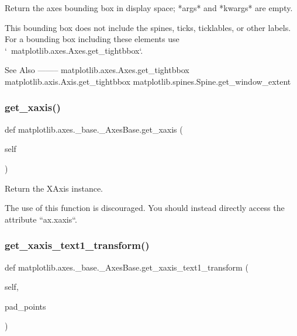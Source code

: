 \begin{DoxyVerb}Return the axes bounding box in display space; *args* and *kwargs*
are empty.

This bounding box does not include the spines, ticks, ticklables,
or other labels.  For a bounding box including these elements use
`~matplotlib.axes.Axes.get_tightbbox`.

See Also
--------
matplotlib.axes.Axes.get_tightbbox
matplotlib.axis.Axis.get_tightbbox
matplotlib.spines.Spine.get_window_extent
\end{DoxyVerb}
 \mbox{\label{classmatplotlib_1_1axes_1_1__base_1_1__AxesBase_ad2ccbe3213fcc1b7441d1751dec32773}} 
\subsubsection{\texorpdfstring{get\+\_\+xaxis()}{get\_xaxis()}}
{\footnotesize\ttfamily def matplotlib.\+axes.\+\_\+base.\+\_\+\+Axes\+Base.\+get\+\_\+xaxis (\begin{DoxyParamCaption}\item[{}]{self }\end{DoxyParamCaption})}

\begin{DoxyVerb}Return the XAxis instance.

The use of this function is discouraged. You should instead directly
access the attribute ``ax.xaxis``.
\end{DoxyVerb}
 \mbox{\label{classmatplotlib_1_1axes_1_1__base_1_1__AxesBase_a8896d8871426ff604d109f5e4682716a}} 
\subsubsection{\texorpdfstring{get\+\_\+xaxis\+\_\+text1\+\_\+transform()}{get\_xaxis\_text1\_transform()}}
{\footnotesize\ttfamily def matplotlib.\+axes.\+\_\+base.\+\_\+\+Axes\+Base.\+get\+\_\+xaxis\+\_\+text1\+\_\+transform (\begin{DoxyParamCaption}\item[{}]{self,  }\item[{}]{pad\+\_\+points }\end{DoxyParamCaption})}

